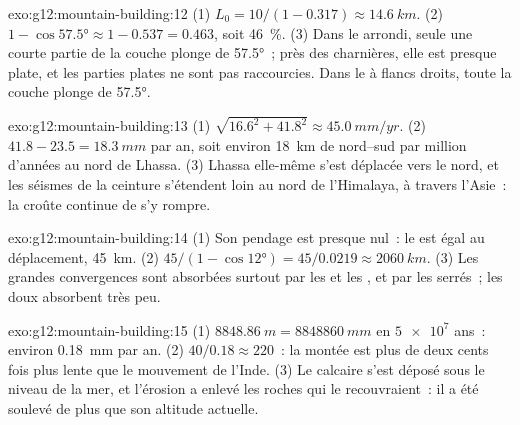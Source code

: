 \begin{solution}{exo:g12:mountain-building:12}
(1) $L_0 = 10/(1 - 0.317) \approx \qty{14.6}{km}$. (2) $1 - \cos\ang{57.5}
\approx 1 - 0.537 = 0.463$, soit \qty{46}{\percent}. (3) Dans le 
arrondi, seule une courte partie de la couche plonge de \ang{57.5}~; près
des charnières, elle est presque plate, et les parties plates ne sont pas
raccourcies. Dans le  à flancs droits, toute la couche plonge de
\ang{57.5}.
\end{solution}

\begin{solution}{exo:g12:mountain-building:13}
(1) $\sqrt{16.6^2 + 41.8^2} \approx \qty{45.0}{mm/yr}$. (2) $41.8 - 23.5 =
\qty{18.3}{mm}$ par an, soit environ \qty{18}{km} de 
nord--sud par million d'années au nord de Lhassa. (3) Lhassa elle-même
s'est déplacée vers le nord, et les séismes de la ceinture s'étendent loin
au nord de l'Himalaya, à travers l'Asie~: la croûte continue de s'y
rompre.
\end{solution}

\begin{solution}{exo:g12:mountain-building:14}
(1) Son pendage est presque nul~: le  est égal au
déplacement, \qty{45}{km}. (2) $45/(1 - \cos\ang{12}) = 45/0.0219 \approx \qty{2060}{km}$.
(3) Les grandes convergences sont absorbées surtout par les 
et les , et par les  serrés~; les  doux
absorbent très peu.
\end{solution}

\begin{solution}{exo:g12:mountain-building:15}
(1) $\qty{8848.86}{m} = \qty{8848860}{mm}$ en $\num{5e7}$ ans~: environ
\qty{0.18}{mm} par an. (2) $40/0.18 \approx 220$~: la montée est plus de
deux cents fois plus lente que le mouvement de l'Inde. (3) Le calcaire
s'est déposé sous le niveau de la mer, et l'érosion a enlevé les roches qui
le recouvraient~: il a été soulevé de plus que son altitude actuelle.
\end{solution}

